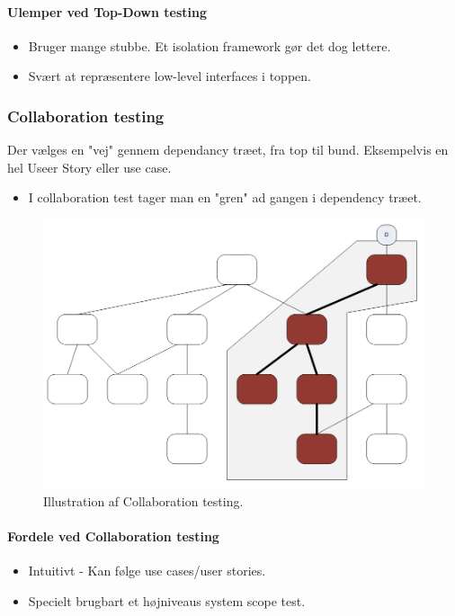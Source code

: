 \paragraph{Ulemper ved Top-Down testing}

\begin{itemize}
	\item Bruger mange stubbe. Et isolation framework gør det dog lettere.
	\item Svært at repræsentere low-level interfaces i toppen. 
\end{itemize}


\subsubsection{Collaboration testing}
Der vælges en "vej" gennem dependancy træet, fra top til bund. Eksempelvis en hel Useer Story eller use case.


\begin{itemize}
	\item I collaboration test tager man en "gren" ad gangen i dependency træet.
\end{itemize}

\begin{figure}
\centering
\includegraphics[width=0.7\linewidth]{figs/collaborationTesting.PNG}
\caption{Illustration af Collaboration testing.}
\label{fig:collaborationTesting}
\end{figure}

\paragraph{Fordele ved Collaboration testing}

\begin{itemize}
	\item Intuitivt - Kan følge use cases/user stories.
	\item Specielt brugbart et højniveaus system scope test.
\end{itemize}

